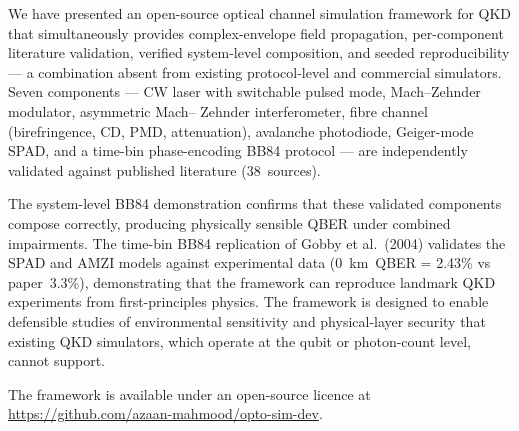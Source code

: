 \documentclass[3p,times,preprint]{elsarticle}
\begin{document}
We have presented an open-source optical channel simulation framework
for QKD that simultaneously provides complex-envelope field propagation,
per-component literature validation, verified system-level composition,
and seeded reproducibility --- a combination absent from existing
protocol-level and commercial simulators.  Seven components --- CW laser
with switchable pulsed mode, Mach--Zehnder modulator, asymmetric Mach--
Zehnder interferometer, fibre channel (birefringence, CD, PMD,
attenuation), avalanche photodiode, Geiger-mode SPAD, and a time-bin
phase-encoding BB84 protocol --- are independently validated against
published literature (38~sources).

The system-level BB84 demonstration confirms that these validated
components compose correctly, producing physically sensible QBER
under combined impairments.  The time-bin BB84 replication of Gobby
et al.~(2004) validates the SPAD and AMZI models against experimental
data (0~km~QBER = 2.43\% vs paper~3.3\%), demonstrating that the
framework can reproduce landmark QKD experiments from first-principles
physics.  The framework is designed to enable defensible studies of
environmental sensitivity and physical-layer security that existing
QKD simulators, which operate at the qubit or photon-count level,
cannot support.

The framework is available under an open-source licence at
\url{https://github.com/azaan-mahmood/opto-sim-dev}.
\end{document}

